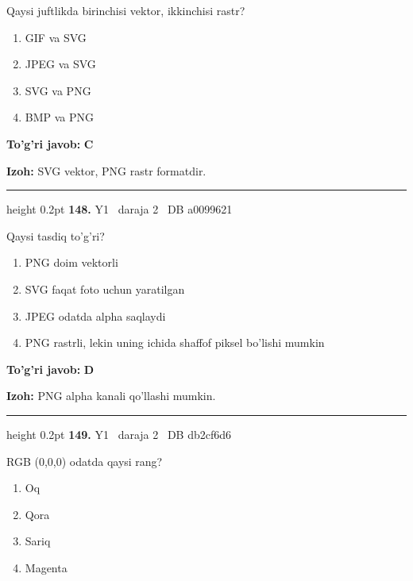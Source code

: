 \documentclass[10pt,a4paper,oneside]{article}
\begin{document}
Qaysi juftlikda birinchisi vektor, ikkinchisi rastr?
\begin{enumerate}[label=\Alph*),leftmargin=9mm]
\item GIF va SVG
\item JPEG va SVG
\item SVG va PNG
\item BMP va PNG
\end{enumerate}
\begin{tcolorbox}[enhanced,breakable,colback=teal!4,colframe=teal!45!black,boxrule=0.45pt,arc=1.2mm,left=2.8mm,right=2.8mm,top=2mm,bottom=2mm,before skip=2mm,after skip=2mm]
\textbf{\color{teal}To'g'ri javob:} \textbf{C}
\par\smallskip
\textbf{Izoh:} SVG vektor, PNG rastr formatdir.
\end{tcolorbox}
\vspace{2mm}\hrule height 0.2pt \vspace{4mm}
\hypertarget{q148}{\textbf{\color{ink}148.}}  {\color{muted}\scriptsize Y1 \textbullet\ daraja 2 \textbullet\ DB a0099621}
\par
Qaysi tasdiq to'g'ri?
\begin{enumerate}[label=\Alph*),leftmargin=9mm]
\item PNG doim vektorli
\item SVG faqat foto uchun yaratilgan
\item JPEG odatda alpha saqlaydi
\item PNG rastrli, lekin uning ichida shaffof piksel bo'lishi mumkin
\end{enumerate}
\begin{tcolorbox}[enhanced,breakable,colback=teal!4,colframe=teal!45!black,boxrule=0.45pt,arc=1.2mm,left=2.8mm,right=2.8mm,top=2mm,bottom=2mm,before skip=2mm,after skip=2mm]
\textbf{\color{teal}To'g'ri javob:} \textbf{D}
\par\smallskip
\textbf{Izoh:} PNG alpha kanali qo'llashi mumkin.
\end{tcolorbox}
\vspace{2mm}\hrule height 0.2pt \vspace{4mm}
\hypertarget{q149}{\textbf{\color{ink}149.}}  {\color{muted}\scriptsize Y1 \textbullet\ daraja 2 \textbullet\ DB db2cf6d6}
\par
RGB (0,0,0) odatda qaysi rang?
\begin{enumerate}[label=\Alph*),leftmargin=9mm]
\item Oq
\item Qora
\item Sariq
\item Magenta
\end{enumerate}
\end{document}
